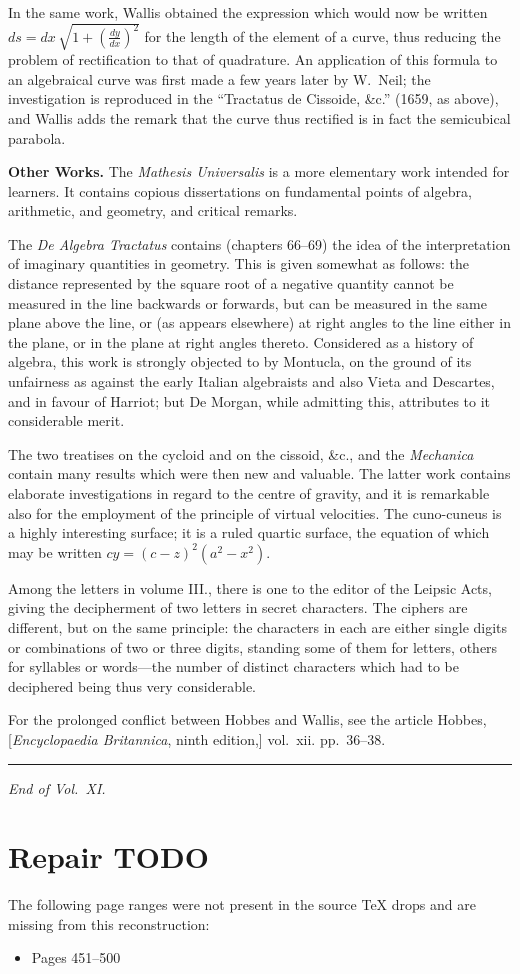 \documentclass[11pt,a4paper]{book}
\begin{document}
In the same work, Wallis obtained the expression which would now be written $ds = dx\,\sqrt{1 + (\frac{dy}{dx})^{2}}$ for the length of the element of a curve, thus reducing the problem of rectification to that of quadrature. An application of this formula to an algebraical curve was first made a few years later by W.~Neil; the investigation is reproduced in the ``Tractatus de Cissoide, \&c.'' (1659, as above), and Wallis adds the remark that the curve thus rectified is in fact the semicubical parabola.

\textbf{Other Works.}\quad
The \textit{Mathesis Universalis} is a more elementary work intended for learners. It contains copious dissertations on fundamental points of algebra, arithmetic, and geometry, and critical remarks.

The \textit{De Algebra Tractatus} contains (chapters 66--69) the idea of the interpretation of imaginary quantities in geometry. This is given somewhat as follows: the distance represented by the square root of a negative quantity cannot be measured in the line backwards or forwards, but can be measured in the same plane above the line, or (as appears elsewhere) at right angles to the line either in the plane, or in the plane at right angles thereto. Considered as a history of algebra, this work is strongly objected to by Montucla, on the ground of its unfairness as against the early Italian algebraists and also Vieta and Descartes, and in favour of Harriot; but De Morgan, while admitting this, attributes to it considerable merit.

The two treatises on the cycloid and on the cissoid, \&c., and the \textit{Mechanica} contain many results which were then new and valuable. The latter work contains elaborate investigations in regard to the centre of gravity, and it is remarkable also for the employment of the principle of virtual velocities. The cuno-cuneus is a highly interesting surface; it is a ruled quartic surface, the equation of which may be written $cy = (c - z)^{2}(a^{2} - x^{2})$.

Among the letters in volume III., there is one to the editor of the Leipsic Acts, giving the decipherment of two letters in secret characters. The ciphers are different, but on the same principle: the characters in each are either single digits or combinations of two or three digits, standing some of them for letters, others for syllables or words---the number of distinct characters which had to be deciphered being thus very considerable.

For the prolonged conflict between Hobbes and Wallis, see the article Hobbes, [\textit{Encyclopaedia Britannica}, ninth edition,] vol.~xii. pp.~36--38.

\vspace{1em}
\hrule
\vspace{1em}

\begin{center}
\textit{End of Vol.~XI.}
\end{center}
\clearpage


\clearpage
\section*{Repair TODO}
The following page ranges were not present in the source TeX drops and are missing from this reconstruction:
\begin{itemize}
\item Pages 451--500
\end{itemize}
\end{document}
